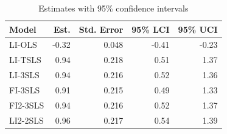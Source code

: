 \begin{table}[htbp]
\centering
\caption{Estimates with 95\% confidence intervals}
\label{tab:estimates}
\begin{tabular}{lrrrr}
\toprule
Model & Est. & Std. Error & 95\% LCI & 95\% UCI \\
\midrule
LI-OLS    & -0.32 & 0.048 & -0.41 & -0.23 \\
LI-TSLS   &  0.94 & 0.218 &  0.51 &  1.37 \\
LI-3SLS   &  0.94 & 0.216 &  0.52 &  1.36 \\
FI-3SLS   &  0.91 & 0.215 &  0.49 &  1.33 \\
FI2-3SLS  &  0.94 & 0.216 &  0.52 &  1.37 \\
LI2-2SLS  &  0.96 & 0.217 &  0.54 &  1.39 \\
\bottomrule
\end{tabular}
\end{table}

